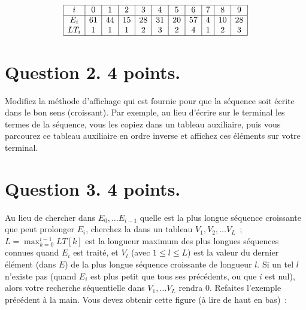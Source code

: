 \documentclass[a4paper]{article}
\begin{document}
\begin{center}
$$
\begin{array}{|c|c|c|c|c|c|c|c|c|c|c|}
\hline
i &  0 &  1 &  2 &  3 &  4 &  5 &  6 &  7 &  8 &  9 \\
\hline
E_i  & 61 &   44 &      15 &      28 &      31 &      20 &      57 &      4 &       10 &      28 \\
LT_i & 1 &    1 &       1 &       2 &       3 &       2 &       4 &       1 &       2 &       3 \\
\hline
\end{array}
$$
\end{center}

\section*{Question 2. 4 points.} Modifiez la m\'ethode d'affichage qui est fournie  pour que la s\'equence soit \'ecrite dans le bon sens
(croissant).  Par exemple, au lieu d'\'ecrire sur le terminal les termes de la s\'equence, vous les copiez dans un tableau auxiliaire, puis
vous parcourez ce tableau auxiliaire en ordre inverse et affichez ces \'el\'ements sur votre terminal.

\newpage
\section*{Question 3. 4 points.} Au lieu de chercher dans $E_0, \ldots E_{i-1}$ quelle est la plus longue s\'equence croissante que peut prolonger $E_i$,
cherchez la dans un tableau $V_1, V_2, \ldots V_L$~; $L=\max_{k=0}^{i-1} LT[k]$ est la longueur maximum des plus longues s\'equences connues quand $E_i$ est trait\'e, et
$V_l$ (avec $1\le l\le L$) est la valeur du dernier \'el\'ement (dans $E$) de la plus longue s\'equence croissante de longueur $l$.  
Si un tel $l$ n'existe pas (quand $E_i$ est plus petit que tous ses pr\'ec\'edents, ou que $i$ est nul),
alors votre recherche s\'equentielle dans $V_1, \ldots V_L$  rendra 0. 
Refaites l'exemple pr\'ec\'edent  \`a la main. Vous devez obtenir cette figure (\`a lire de haut en bas)~:
\end{document}
